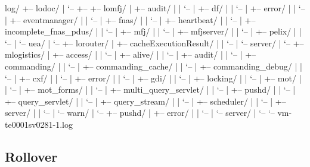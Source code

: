\begin{compactalltt}
	log/
	+-- lodoc/
	|   `-- \lodocServerLog
	+-- \mlogisticsLogserverLog
	+-- lomfj/
	|   +-- audit/
	|   |   `-- \lomfjAuditLog
	|   +-- df/
	|   |   `-- \lomfjDfLog
	|   +-- error/
	|   |   `-- \lomfjErrorLog
	|   +-- eventmanager/
	|   |   `-- \lomfjEventmanagerLog
	|   +-- fnas/
	|   |   `-- \lomfjFnasLog
	|   +-- heartbeat/
	|   |   `-- \lomfjHeartbeatLog
	|   +-- incomplete_fnas_pdus/
	|   |   `-- \lomfjIncompleteFnasPdusLog
	|   +-- mfj/
	|   |   `-- \lomfjMfjLog
	|   +-- mfjserver/
	|   |   `-- \lomfjMfjServerLog
	|   +-- pelix/
	|   |   `-- \lomfjPelixLog
	|   `-- uea/
	|       `-- \lomfjUeaLog
	+-- lorouter/
	|   +-- cacheExecutionResult/
	|   |   `-- \lorouterCacheExecutionResultLog
	|   `-- server/
	|       `-- \lorouterServerLog
	+-- mlogistics/
	|   +-- access/
	|   |   `-- \mlogisticsAccessLog
	|   +-- alive/
	|   |   `-- \mlogisticsAliveLog
	|   +-- audit/
	|   |   `-- \mlogisticsAuditLog
	|   +-- commanding/
	|   |   `-- \mlogisticsCommandingLog
	|   +-- commanding_cache/
	|   |   `-- \mlogisticsCommandingCacheLog
	|   +-- commanding_debug/
	|   |   `-- \mlogisticsCommandingDebugLog
	|   +-- cxf/
	|   |   `-- \mlogisticsCxfLog
	|   +-- error/
	|   |   `-- \mlogisticsErrorLog
	|   +-- gdi/
	|   |   `-- \mlogisticsGdiImportLog
	|   +-- locking/
	|   |   `-- \mlogisticsLockingLog
	|   +-- mot/
	|   |   `-- \mlogisticsMotLog
	|   +-- mot_forms/
	|   |   `-- \mlogisticsMotFormsLog
	|   +-- multi_query_servlet/
	|   |   `-- \mlogisticsMultiQueryServletLog
	|   +-- pushd/
	|   |   `-- \mlogisticsPushDLog
	|   +-- query_servlet/
	|   |   `-- \mlogisticsQueryServletLog
	|   +-- query_stream/
	|   |   `-- \mlogisticsQueryStreamLog
	|   +-- scheduler/
	|   |   `-- \mlogisticsSchedulerLog
	|   +-- server/
	|   |   `-- \mlogisticsServerLog
	|   `-- warn/
	|       `-- \mlogisticsWarnLog
	+-- pushd/
	|   +-- error/
	|   |   `-- \pushdErrorLog
	|   `-- server/
	|       `-- \pushdServerLog
	`-- vm-te0001sv0281-1.log
\end{compactalltt}


\subsection{Rollover}

